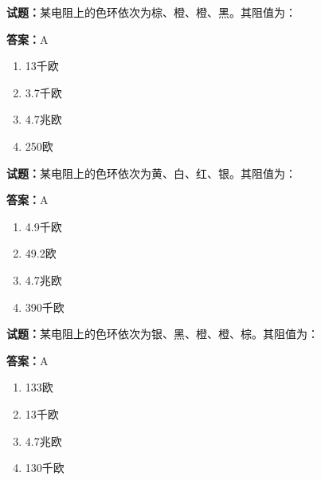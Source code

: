 \documentclass{ctexbook}
\begin{document}




\vspace{1em}

\textbf{试题：}某电阻上的色环依次为棕、橙、橙、黑。其阻值为： 

\textbf{答案：}A 

\begin{enumerate}[leftmargin=3em]
  \item 13千欧 

  \item 3.7千欧 

  \item 4.7兆欧 

  \item 250欧 

\end{enumerate}





\vspace{1em}

\textbf{试题：}某电阻上的色环依次为黄、白、红、银。其阻值为： 

\textbf{答案：}A 

\begin{enumerate}[leftmargin=3em]
  \item 4.9千欧 

  \item 49.2欧 

  \item 4.7兆欧 

  \item 390千欧 

\end{enumerate}






\vspace{1em}

\textbf{试题：}某电阻上的色环依次为银、黑、橙、橙、棕。其阻值为： 

\textbf{答案：}A 

\begin{enumerate}[leftmargin=3em]
  \item 133欧 

  \item 13千欧 

  \item 4.7兆欧 

  \item 130千欧 

\end{enumerate}
\end{document}
